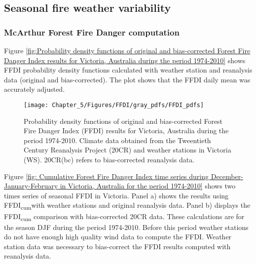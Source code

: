 \subsection{Seasonal fire weather variability}


\subsubsection{McArthur Forest Fire Danger computation}

Figure \ref{fig:Probability density functions of original and bias-corrected Forest Fire Danger Index results for Victoria, Australia during the period 1974-2010}
shows FFDI probability density functions calculated with weather station
and reanalysis data (original and bias-corrected). The plot shows
that the FFDI daily mean was accurately adjusted. 

\begin{figure}[h]
\noindent \begin{centering}
\texttt{[image: Chapter\_5/Figures/FFDI/gray\_pdfs/FFDI\_pdfs]}
\par\end{centering}

\caption[Probability density functions of original and bias-corrected Forest
Fire Danger Index (FFDI) results for Victoria, Australia during the
period 1974-2010]{Probability density functions of original and bias-corrected Forest
Fire Danger Index (FFDI) results for Victoria, Australia during the
period 1974-2010. Climate data obtained from the Tweentieth Century
Reanalysis Project (20CR) and weather stations in Victoria (WS). 20CR(bc)
refers to bias-corrected reanalysis data. \label{fig:Probability density functions of orginal and bias-corrected Forest Fire Danger Index results for Victoria, Australia during the period 1974-2010}}
\end{figure}


Figure \ref{fig: Cumulative Forest Fire Danger Index time series during December-January-February in Victoria, Australia for the period 1974-2010}
shows two times series of seasonal FFDI in Victoria. Panel a) shows
the results using FFDI\textsubscript{cum}with weather stations and
original reanalysis data. Panel b) displays the FFDI\textsubscript{cum}
comparison with bias-corrected 20CR data. These calculations are for
the season DJF during the period 1974-2010. Before this period weather
stations do not have enough high quality wind data to compute the FFDI. Weather station
data was necessary to bias-correct the FFDI results computed with
reanalysis data. 

